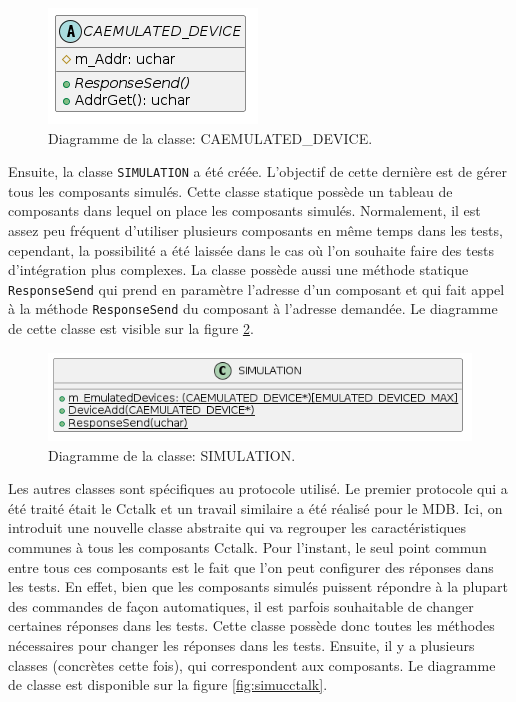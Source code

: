 \documentclass[a4paper]{article}
\begin{document}
\begin{figure}[h!]
  \begin{center}
  \includegraphics[scale=0.5]{./graphs/emulated_device.png}
  \caption{Diagramme de la classe: CAEMULATED\_DEVICE.}
    \label{fig:caemulateddevice}
  \end{center}
\end{figure}

Ensuite, la classe \verb|SIMULATION| a été créée. L'objectif de cette dernière
est de gérer tous les composants simulés. Cette classe statique possède un
tableau de composants dans lequel on place les composants simulés. Normalement,
il est assez peu fréquent d'utiliser plusieurs composants en même temps dans les
tests, cependant, la possibilité a été laissée dans le cas où l'on souhaite
faire des tests d'intégration plus complexes. La classe possède aussi une
méthode statique \verb|ResponseSend| qui prend en paramètre l'adresse d'un
composant et qui fait appel à la méthode \verb|ResponseSend| du composant à
l'adresse demandée. Le diagramme de cette classe est visible sur la figure
\ref{fig:simulationclasse}.

\begin{figure}[h!]
  \begin{center}
  \includegraphics[scale=0.5]{./graphs/simulation_classe.png}
    \caption{Diagramme de la classe: SIMULATION.}
    \label{fig:simulationclasse}
  \end{center}
\end{figure}

Les autres classes sont spécifiques au protocole utilisé. Le premier protocole
qui a été traité était le Cctalk et un travail similaire a été réalisé pour le
MDB. Ici, on introduit une nouvelle classe abstraite qui va regrouper les
caractéristiques communes à tous les composants Cctalk. Pour l'instant, le seul
point commun entre tous ces composants est le fait que l'on peut configurer des
réponses dans les tests. En effet, bien que les composants simulés puissent
répondre à la plupart des commandes de façon automatiques, il est parfois
souhaitable de changer certaines réponses dans les tests. Cette classe possède
donc toutes les méthodes nécessaires pour changer les réponses dans les tests.
Ensuite, il y a plusieurs classes (concrètes cette fois), qui correspondent aux
composants. Le diagramme de classe est disponible sur la figure \ref{fig:simucctalk}.
\end{document}
